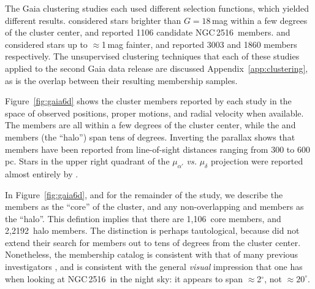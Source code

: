 \documentclass[12pt,twocolumn,tighten]{aastex63}
\newcommand{\cn}{NGC\,2516} %
\newcommand{\ncore}{1{,}106}  %
\newcommand{\nhalo}{2{,}2192} %
\begin{document}
The Gaia clustering studies each used different selection functions,
which yielded different results.  
considered stars brighter than $G=18$\,mag within a few degrees of the
cluster center, and reported 1106 candidate \cn\ members.
 and 
considered stars up to $\approx$1\,mag fainter, and reported 3003 and
1860 members respectively.  The unsupervised clustering techniques
that each of these studies applied to the second Gaia data release are
discussed Appendix~\ref{app:clustering}, as is the overlap between
their resulting membership samples.

Figure~\ref{fig:gaia6d} shows the cluster members reported by each
study in the space of observed positions, proper motions, and radial
velocity when available.  The 
members are all within a few degrees of the cluster center, while the
 and 
members (the ``halo'') span tens of degrees.  Inverting the parallax
shows that members have been reported from line-of-sight distances
ranging from $300$ to $600\,$pc.  Stars in the upper right quadrant of
the $\mu_{\alpha'}$ {\it vs.} $\mu_\delta$ projection were reported
almost entirely by \citet{meingast_2021}.

In Figure~\ref{fig:gaia6d}, and for the remainder of the study, we
describe the  members as the
``core'' of the cluster, and any non-overlapping
 and 
members as the ``halo''.  This defintion implies that there are
\ncore\ core members, and \nhalo\ halo members.  The distinction is
perhaps tautological, because  did
not extend their search for members out to tens of degrees from the
cluster center.  Nonetheless, the 
membership catalog is consistent with that of many previous
investigators \citep[{\it
e.g.},][]{jeffries_ngc2516_2001,Kharchenko_et_al_2013}, and is
consistent with the general {\it visual} impression that one has when
looking at \cn\ in the night sky: it appears to span
$\approx$2$^\circ$, not $\approx20^\circ$.
\end{document}
